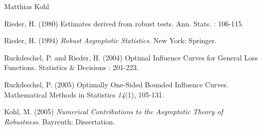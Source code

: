 \begin{Author}\relax
Matthias Kohl 
\end{Author}
\begin{References}\relax
Rieder, H. (1980) Estimates derived from robust tests. Ann. Stats. : 106-115.

Rieder, H. (1994) \emph{Robust Asymptotic Statistics}. New York: Springer.

Ruckdeschel, P. and Rieder, H. (2004) Optimal Influence Curves for
General Loss Functions. Statistics \& Decisions : 201-223.

Ruckdeschel, P. (2005) Optimally One-Sided Bounded Influence Curves.
Mathematical Methods in Statistics \emph{14}(1), 105-131.

Kohl, M. (2005) \emph{Numerical Contributions to the Asymptotic Theory of Robustness}. 
Bayreuth: Dissertation.
\end{References}
\begin{SeeAlso}\relax
{}
\end{SeeAlso}

